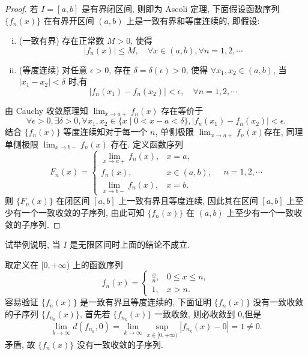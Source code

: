 \begin{proof}
  若 $I=[a,b]$ 是有界闭区间, 则即为 Ascoli 定理, 
  下面假设函数序列 $\{f_n(x)\}$ 在有界开区间 $(a,b)$ 上是一致有界和等度连续的, 即假设:
  \begin{enumerate}[(i)]
  \item (一致有界) 存在正常数 $M>0$, 使得
    \[|f_n(x)|\leq M,\quad\forall x\in(a,b),\forall n=1,2,\cdots\]
  \item (等度连续) 对任意 $\epsilon>0$, 存在 $\delta=\delta(\epsilon)>0$,
    使得 $\forall x_1,x_2\in(a,b)$, 当 $|x_1-x_2|<\delta$ 时,有
    \[|f_n(x_1)-f_n(x_2)|<\epsilon,\quad\forall n=1,2,\cdots\]
  \end{enumerate}
  由 Cauchy 收敛原理知 $\lim_{x\to a+}f_n(x)$ 存在等价于
  \[\forall\epsilon>0,\exists\delta>0,
    \forall x_1,x_2\in\{x\mid 0<x-a<\delta\},|f_n(x_1)-f_n(x_2)|<\epsilon.\]
  结合 $\{f_n(x)\}$ 等度连续知对于每一个 $n$, 单侧极限 $\displaystyle\lim_{x\to a+}f_n(x)$存在, 
  同理单侧极限 $\displaystyle\lim_{x\to b-}f_n(x)$ 存在. 定义函数序列
  \[F_n(x)=
  \begin{cases}
    \lim\limits_{x\to a+}f_n(x), & x=a,\\
    f_n(x),                      & x\in (a,b),\\
    \lim\limits_{x\to b-}f_n(x), & x=b.
  \end{cases}\quad n=1,2,\cdots\]
  则 $\{F_n(x)\}$ 在闭区间 $[a,b]$ 上一致有界且等度连续, 因此其在区间 $[a,b]$ 上至少有一个一致收敛的子序列,
  由此可知 $\{f_n(x)\}$ 在 $(a,b)$ 上至少有一个一致收敛的子序列.
\end{proof}



\begin{exercise}
  试举例说明, 当 $I$ 是无限区间时上面的结论不成立.
\end{exercise}

\begin{solve}
  取定义在 $[0,+\infty)$ 上的函数序列
  \[f_n(x)=
    \begin{cases}
      \frac{x}{n}, & 0\leq x\leq n,\\
      1,           & x>n.
    \end{cases}\]
  容易验证 $\{f_n(x)\}$ 是一致有界且等度连续的,
  下面证明 $\{f_n(x)\}$ 没有一致收敛的子序列 $\{f_{n_k}(x)\}$,
  首先若 $\{f_{n_k}(x)\}$ 一致收敛, 则必收敛到 $0$,但是
  \[\lim_{k\to\infty}d(f_{n_k},0)=\lim_{k\to\infty}\sup_{x\in[0,+\infty)}|f_{n_k}(x)-0|=1\neq 0.\]
  矛盾, 故 $\{f_n(x)\}$ 没有一致收敛的子序列.
\end{solve}



